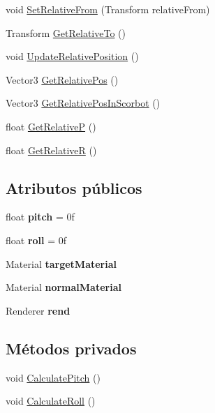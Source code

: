 \begin{DoxyCompactItemize}
\item 
void \mbox{\hyperlink{class_target_model_a0a23959221104882e778ae3e7d10fe11}{Set\+Relative\+From}} (Transform relative\+From)
\item 
Transform \mbox{\hyperlink{class_target_model_a601f2538a41b5bdaba72c3f81d820710}{Get\+Relative\+To}} ()
\item 
void \mbox{\hyperlink{class_target_model_a41b6989fae346f10e3d58ccd0587fc83}{Update\+Relative\+Position}} ()
\item 
Vector3 \mbox{\hyperlink{class_target_model_a098d820aa132eb79824aa019d1e0a3cb}{Get\+Relative\+Pos}} ()
\item 
Vector3 \mbox{\hyperlink{class_target_model_ac404e12af9eaccea8afd07b0fe3d638e}{Get\+Relative\+Pos\+In\+Scorbot}} ()
\item 
float \mbox{\hyperlink{class_target_model_a9dd0c95572ab63199d214ae7517c55bf}{Get\+RelativeP}} ()
\item 
float \mbox{\hyperlink{class_target_model_ae564153ce4906bd59461949b2531b5ff}{Get\+RelativeR}} ()
\end{DoxyCompactItemize}
\subsection*{Atributos públicos}
\begin{DoxyCompactItemize}
\item 
\mbox{\label{class_target_model_a7586759a1d22048b40fa4f1cb0ec9b4a}} 
float {\bfseries pitch} = 0f
\item 
\mbox{\label{class_target_model_a3ce8f5a45b53a1996364e6e5e3663368}} 
float {\bfseries roll} = 0f
\item 
\mbox{\label{class_target_model_ae29e0799432fa79b04a4a2f9a5260ba3}} 
Material {\bfseries target\+Material}
\item 
\mbox{\label{class_target_model_a9944462b2a67606e945a45fea29b7650}} 
Material {\bfseries normal\+Material}
\item 
\mbox{\label{class_target_model_a0fde8af97987685b579466df499c8179}} 
Renderer {\bfseries rend}
\end{DoxyCompactItemize}
\subsection*{Métodos privados}
\begin{DoxyCompactItemize}
\item 
void \mbox{\hyperlink{class_target_model_aa46b3a43a11a77e303ca082c8d29b998}{Calculate\+Pitch}} ()
\item 
void \mbox{\hyperlink{class_target_model_a503c190ab713118b3eb98569c645f4a1}{Calculate\+Roll}} ()
\end{DoxyCompactItemize}
